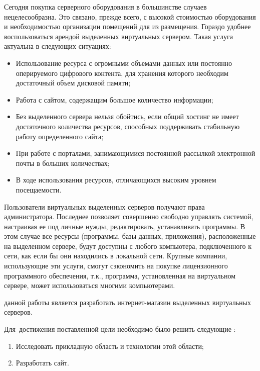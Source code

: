 Сегодня покупка серверного оборудования в большинстве случаев нецелесообразна. Это связано, прежде всего, с высокой стоимостью оборудования и необходимостью организации помещений для из размещения. Гораздо удобнее воспользоваться арендой выделенных виртуальных сервером. Такая услуга актуальна в следующих ситуациях:
\begin{itemize}
  \item Использование ресурса с огромными объемами данных или постоянно оперируемого цифрового контента, для хранения которого необходим достаточный объем дисковой памяти;
  \item Работа с сайтом, содержащим большое количество информации;
  \item Без выделенного сервера нельзя обойтись, если общий хостинг не имеет достаточного количества ресурсов, способных поддерживать стабильную работу определенного сайта;
  \item При работе с порталами, занимающимися постоянной рассылкой электронной почты в больших количествах;
  \item В ходе использования ресурсов, отличающихся высоким уровнем посещаемости.
\end{itemize}


Пользователи виртуальных выделенных серверов получают права администратора.
Последнее позволяет совершенно свободно управлять системой, настраивая ее под личные нужды, редактировать, устанавливать программы.
В этом случае все ресурсы (программы, базы данных, приложения), расположенные на выделенном сервере, будут доступны с любого компьютера, подключенного к сети, как если бы они находились в локальной сети.
Крупные компании, использующие эти услуги, смогут сэкономить на покупке лицензионного программного обеспечения, т.к., программа, установленная на виртуальном сервере, может использоваться многими компьютерами.


{\aim} данной работы является разработать интернет-магазин выделенных виртуальных серверов.

Для~достижения поставленной цели необходимо было решить следующие {\tasks}:
\begin{enumerate}
  \item Исследовать прикладную область и технологии этой области;
  \item Разработать сайт.
\end{enumerate}


